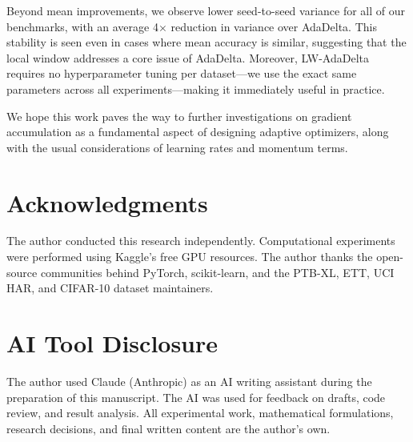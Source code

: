 \documentclass[11pt,a4paper]{article}
\begin{document}
Beyond mean improvements, we observe lower seed-to-seed variance for all of our benchmarks, with an average 4$\times$ reduction in variance over AdaDelta. This stability is seen even in cases where mean accuracy is similar, suggesting that the local window addresses a core issue of AdaDelta. Moreover, LW-AdaDelta requires no hyperparameter tuning per dataset---we use the exact same parameters across all experiments---making it immediately useful in practice.

We hope this work paves the way to further investigations on gradient accumulation as a fundamental aspect of designing adaptive optimizers, along with the usual considerations of learning rates and momentum terms.

\section*{Acknowledgments}

The author conducted this research independently. Computational experiments were performed using Kaggle's free GPU resources. The author thanks the open-source communities behind PyTorch, scikit-learn, and the PTB-XL, ETT, UCI HAR, and CIFAR-10 dataset maintainers.

\section*{AI Tool Disclosure}

The author used Claude (Anthropic) as an AI writing assistant during the preparation of this manuscript. The AI was used for feedback on drafts, code review, and result analysis. All experimental work, mathematical formulations, research decisions, and final written content are the author's own.
\end{document}
